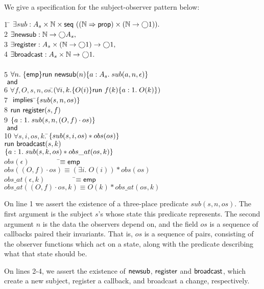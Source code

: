 \documentclass[preprint,natbib]{sigplanconf}
\begin{document}
We give a specification for the subject-observer pattern below:
%
{\small
\begin{tabbing}
1 \qquad \= $\exists sub : A_s \times \mathbb{N} \times \mbox{\textsf{{seq }}}{((\mathbb{N}\Rightarrow\mbox{\textsf{{prop}}}) \times (\mathbb{N}\to \bigcirc{1}))}.$ \\
2 \> $\exists \mbox{\textsf{{newsub}}} : \mathbb{N} \to \bigcirc{A_s},$ \\ 
3 \> $\exists \mbox{\textsf{{register}}} : A_s \times (\mathbb{N} \to \bigcirc{1}) \to \bigcirc{1},$ \\
4 \> $\exists \mbox{\textsf{{broadcast}}} : A_s \times \mathbb{N} \to \bigcirc{1}.$ \\
\\[0.5em]
5 \>$\forall n.\; \{{\mathsf{emp}}\}{\mbox{\textsf{{run }}}{\mbox{\textsf{{newsub}}}(n)}}\{{a:A_s}.\;{sub(a, n, \epsilon)}\}$ \\
\> $\mbox{\textsf{{ and }}}$ \\
6 \> $\forall f, O, s, n, os. $\=$(\forall i, k. \{{O(i)}\}{\mbox{\textsf{{run }}}{f(k)}}\{{a:1}.\;{O(k)}\})$ \\
7\> \>$\mbox{\textsf{{ implies }}}$\=$\{{sub(s, n, os)}\}$ \\
8\> \>          \>$\mbox{\textsf{{run }}}{\mbox{\textsf{{register}}}(s, f)}$ \\
9 \> \>          \>$\{{a:1.\; sub(s, n, (O,f)\cdot os)}\}$ \\
\> $\mbox{\textsf{{ and }}}$ \\
10 \> $\forall s,i,os,k.\; $\=$\{{sub(s, i, os) * obs(os)}\}$ \\
  \>                       \>$\mbox{\textsf{{run }}}{\mbox{\textsf{{broadcast}}}}(s,k)$ \\
  \>                       \>$\{{a:1.\; sub(s, k, os) * obs\_at(os, k)}\}$ 
\\[0.5em]
$obs(\epsilon) \;\qquad\qquad $\=$\equiv \mathsf{emp}$ \\
$obs((O,f)\cdot os) $\>$\equiv (\exists i.\; O(i)) * obs(os)$ 
\\[0.5em]
$obs\_at(\epsilon, k) \;\qquad\qquad $\=$\equiv \mathsf{emp}$ \\
$obs\_at((O,f)\cdot os, k) $\>$\equiv O(k) * obs\_at(os, k)$ 
\\
\end{tabbing}
}
%
On line 1 we assert the existence of a three-place predicate $sub(s,
n, os)$. The first argument is the subject $s$'s whose state this
predicate represents. The second argument $n$ is the data the
observers depend on, and the field $os$ is a sequence of callbacks
paired their invariants. That is, $os$ is a sequence of pairs,
consisting of the observer functions which act on a state, along with
the predicate describing what that state should be.

On lines 2-4, we assert the existence of $\mbox{\textsf{{newsub}}}$,
$\mbox{\textsf{{register}}}$ and $\mbox{\textsf{{broadcast}}}$, which create a new
subject, register a callback, and broadcast a change, respectively.
\end{document}

